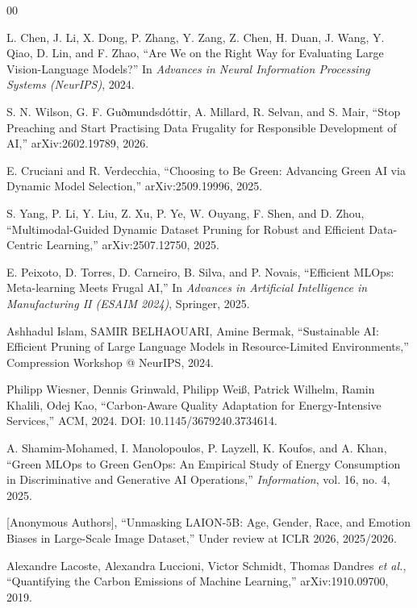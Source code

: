 \begin{thebibliography}{00}

L. Chen, J. Li, X. Dong, P. Zhang, Y. Zang, Z. Chen, H. Duan, J. Wang, Y. Qiao, D. Lin, and F. Zhao, 
``Are We on the Right Way for Evaluating Large Vision-Language Models?'' 
In \emph{Advances in Neural Information Processing Systems (NeurIPS)}, 2024.

S. N. Wilson, G. F. Guðmundsdóttir, A. Millard, R. Selvan, and S. Mair, 
``Stop Preaching and Start Practising Data Frugality for Responsible Development of AI,'' 
arXiv:2602.19789, 2026.

E. Cruciani and R. Verdecchia, 
``Choosing to Be Green: Advancing Green AI via Dynamic Model Selection,'' 
arXiv:2509.19996, 2025.

S. Yang, P. Li, Y. Liu, Z. Xu, P. Ye, W. Ouyang, F. Shen, and D. Zhou, 
``Multimodal-Guided Dynamic Dataset Pruning for Robust and Efficient Data-Centric Learning,'' 
arXiv:2507.12750, 2025.

E. Peixoto, D. Torres, D. Carneiro, B. Silva, and P. Novais, 
``Efficient MLOps: Meta-learning Meets Frugal AI,'' 
In \emph{Advances in Artificial Intelligence in Manufacturing II (ESAIM 2024)}, Springer, 2025.

Ashhadul Islam, SAMIR BELHAOUARI, Amine Bermak, 
``Sustainable AI: Efficient Pruning of Large Language Models in Resource-Limited Environments,'' 
Compression Workshop @ NeurIPS, 2024.

Philipp Wiesner, Dennis Grinwald, Philipp Weiß, Patrick Wilhelm, Ramin Khalili, Odej Kao, 
``Carbon-Aware Quality Adaptation for Energy-Intensive Services,'' 
ACM, 2024. DOI: 10.1145/3679240.3734614.

A. Shamim-Mohamed, I. Manolopoulos, P. Layzell, K. Koufos, and A. Khan, 
``Green MLOps to Green GenOps: An Empirical Study of Energy Consumption in Discriminative and Generative AI Operations,'' 
\emph{Information}, vol. 16, no. 4, 2025.

[Anonymous Authors], 
``Unmasking LAION-5B: Age, Gender, Race, and Emotion Biases in Large-Scale Image Dataset,'' 
Under review at ICLR 2026, 2025/2026.

Alexandre Lacoste, Alexandra Luccioni, Victor Schmidt, Thomas Dandres \emph{et al.}, 
``Quantifying the Carbon Emissions of Machine Learning,'' 
arXiv:1910.09700, 2019.

\end{thebibliography}

